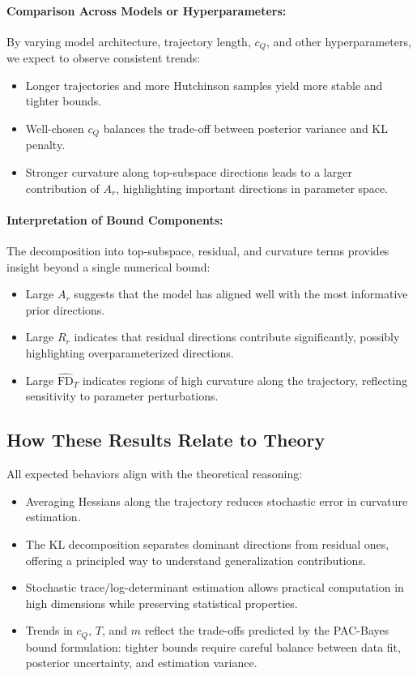 \paragraph{Comparison Across Models or Hyperparameters:}  
By varying model architecture, trajectory length, $c_Q$, and other hyperparameters, we expect to observe consistent trends:  
\begin{itemize}[noitemsep]
    \item Longer trajectories and more Hutchinson samples yield more stable and tighter bounds.
    \item Well-chosen $c_Q$ balances the trade-off between posterior variance and KL penalty.
    \item Stronger curvature along top-subspace directions leads to a larger contribution of $A_r$, highlighting important directions in parameter space.
\end{itemize}

\paragraph{Interpretation of Bound Components:}  
The decomposition into top-subspace, residual, and curvature terms provides insight beyond a single numerical bound:  
\begin{itemize}[noitemsep]
    \item Large $A_r$ suggests that the model has aligned well with the most informative prior directions.  
    \item Large $R_r$ indicates that residual directions contribute significantly, possibly highlighting overparameterized directions.  
    \item Large $\widehat{\mathrm{FD}}_T$ indicates regions of high curvature along the trajectory, reflecting sensitivity to parameter perturbations.
\end{itemize}

\subsection{How These Results Relate to Theory}

All expected behaviors align with the theoretical reasoning:  
\begin{itemize}[noitemsep]
    \item Averaging Hessians along the trajectory reduces stochastic error in curvature estimation.
    \item The KL decomposition separates dominant directions from residual ones, offering a principled way to understand generalization contributions.
    \item Stochastic trace/log-determinant estimation allows practical computation in high dimensions while preserving statistical properties.
    \item Trends in $c_Q$, $T$, and $m$ reflect the trade-offs predicted by the PAC-Bayes bound formulation: tighter bounds require careful balance between data fit, posterior uncertainty, and estimation variance.
\end{itemize}

